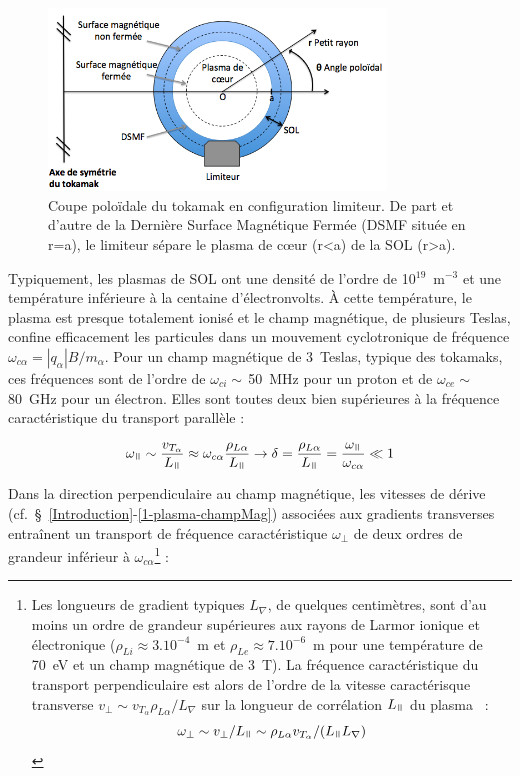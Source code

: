 \begin{refsection}
\begin{figure}[!htbp]
    \centering
	\includegraphics[width=0.8\textwidth]{figures/1-SOLLimiter.png}
	\caption{Coupe poloïdale du tokamak en configuration limiteur. De part et
	d'autre de la Dernière Surface Magnétique Fermée (DSMF située en r=a), le
	limiteur sépare le plasma de c\oe ur (r<a) de la SOL (r>a).}\label{SOL}
\end{figure}
 
Typiquement, les plasmas de SOL ont une densité de
l'ordre de 10$^{19}$~m$^{-3}$ et une température inférieure à la centaine
d'électronvolts. À cette température, le plasma est presque totalement ionisé et
le champ magnétique, de plusieurs Teslas, confine efficacement les particules
dans un mouvement cyclotronique de fréquence
$\omega_{c\alpha}=|q_\alpha|B/m_\alpha$. Pour un champ magnétique de 3~Teslas,
typique des tokamaks, ces fréquences sont de l'ordre de
$\omega_{ci}\sim\,$50~MHz pour un proton et de $\omega_{ce}\sim\,$80~GHz pour un électron.
Elles sont toutes deux bien supérieures à la fréquence caractéristique du
transport parallèle :

\begin{equation}
\omega_\para\sim
\frac{v_{{T}_\alpha}}{L_\para}\approx\omega_{c\alpha}\frac{\rho_{L\alpha}}{L_\para}\rightarrow
\delta=\frac{\rho_{L\alpha}}{L_\para}=\frac{\omega_\para}{\omega_{c\alpha}}\ll1
\end{equation} 

Dans la direction perpendiculaire au champ
magnétique, les vitesses de dérive
\mbox{(cf.~\S~\ref{Introduction}-\ref{1-plasma-champMag})} associées aux
gradients transverses entraînent un
transport de fréquence caractéristique $\omega_\perp$ de deux
ordres de grandeur inférieur à $\omega_{c\alpha}$\footnote{Les longueurs de
gradient typiques $L_\nabla$, de quelques centimètres, sont d'au moins un ordre
de grandeur supérieures aux rayons de Larmor ionique et électronique ($\rho_{Li}\approx3.10^{-4}$~m et
$\rho_{Le}\approx7.10^{-6}$~m pour une température de 70~eV et un champ
magnétique de 3~T). La fréquence caractéristique du transport perpendiculaire
est alors de l'ordre de la vitesse caractérisque transverse $v_\perp\sim
v_{{T}_\alpha}\rho_{L\alpha}/L_\nabla$ sur la longueur de corrélation $L_\para$
du plasma~\parencite{SarazinPhD} : $$\omega_\perp\sim v_\perp/L_\para\sim\rho_{L\alpha} v_{{T}_\alpha}/(L_\para L_\nabla)$$} :


\end{refsection}
